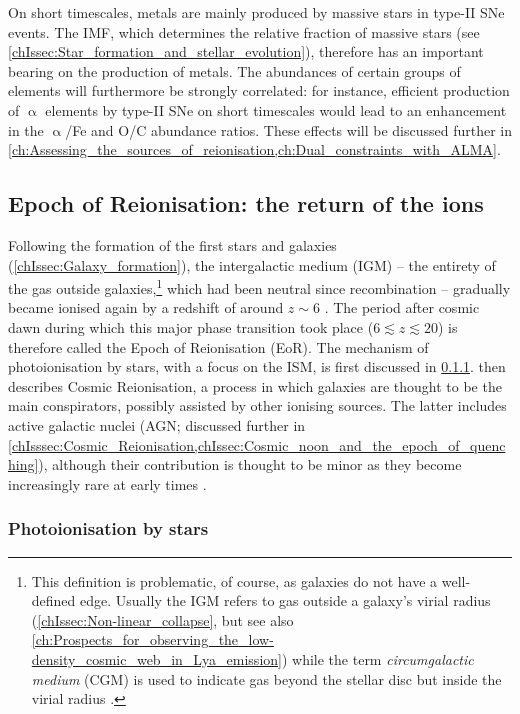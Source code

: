 On short timescales, metals are mainly produced by massive stars in type-II SNe events. The IMF, which determines the relative fraction of massive stars (see \cref{chIssec:Star_formation_and_stellar_evolution}), therefore has an important bearing on the production of metals. The abundances of certain groups of elements will furthermore be strongly correlated: for instance, efficient production of $\upalpha$ elements by type-II SNe on short timescales would lead to an enhancement in the $\upalpha$/Fe and O/C abundance ratios. These effects will be discussed further in \cref{ch:Assessing_the_sources_of_reionisation,ch:Dual_constraints_with_ALMA}.

\subsection{Epoch of Reionisation: the return of the ions}
\label{chIssec:Epoch_of_Reionisation}

Following the formation of the first stars and galaxies (\cref{chIssec:Galaxy_formation}), the intergalactic medium (IGM) -- the entirety of the gas outside galaxies,\footnote{This definition is problematic, of course, as galaxies do not have a well-defined edge. Usually the IGM refers to gas outside a galaxy's virial radius (\cref{chIssec:Non-linear_collapse}, but see also \cref{ch:Prospects_for_observing_the_low-density_cosmic_web_in_Lya_emission}) while the term \textit{circumgalactic medium} (CGM) is used to indicate gas beyond the stellar disc but inside the virial radius \citep*{2017ARA&A..55..389T}.} which had been neutral since recombination -- gradually became ionised again by a redshift of around $z \sim 6$ \citep{2021arXiv211013160R}. The period after cosmic dawn during which this major phase transition took place ($6 \lesssim z \lesssim 20$) is therefore called the Epoch of Reionisation (EoR). The mechanism of photoionisation by stars, with a focus on the ISM, is first discussed in \cref{chIsssec:Photoionisation_by_stars}.  then describes Cosmic Reionisation, a process in which galaxies are thought to be the main conspirators, possibly assisted by other ionising sources. The latter includes active galactic nuclei (AGN; discussed further in \cref{chIsssec:Cosmic_Reionisation,chIssec:Cosmic_noon_and_the_epoch_of_quenching}), although their contribution is thought to be minor \citep{2021arXiv211013160R} as they become increasingly rare at early times \citep{2019MNRAS.488.1035K}.

\subsubsection{Photoionisation by stars}
\label{chIsssec:Photoionisation_by_stars}

